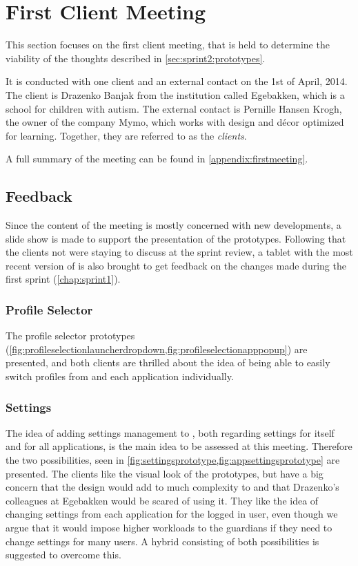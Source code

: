 \section{First Client Meeting}\label{sec:sprint2:firstmeeting}
This section focuses on the first client meeting, that is held to determine the viability of the thoughts described in \cref{sec:sprint2:prototypes}.

It is conducted with one client and an external contact on the 1st of April, 2014.
The client is Drazenko Banjak from the institution called Egebakken, which is a school for children with autism.
The external contact is Pernille Hansen Krogh, the owner of the company Mymo, which works with design and décor optimized for learning.
Together, they are referred to as the \textit{clients}.

A full summary of the meeting can be found in \cref{appendix:firstmeeting}.

\subsection{Feedback}\label{sec:firstmeeting:feedback}
Since the content of the meeting is mostly concerned with new developments, a slide show is made to support the presentation of the prototypes.
Following that the clients not were staying to discuss \giraf at the sprint review, a tablet with the most recent version of \launcher is also brought to get feedback on the changes made during the first sprint (\cref{chap:sprint1}).


\subsubsection{Profile Selector}
The profile selector prototypes (\cref{fig:profileselectionlauncherdropdown,fig:profileselectionapppopup}) are presented, and both clients are thrilled about the idea of being able to easily switch profiles from \launcher and each \giraf application individually.

\subsubsection{Settings}
The idea of adding settings management to \launcher, both regarding settings for \launcher itself and for all \giraf applications, is the main idea to be assessed at this meeting.
Therefore the two possibilities, seen in \cref{fig:settingsprototype,fig:appsettingsprototype} are presented.
The clients like the visual look of the prototypes, but have a big concern that the design would add to much complexity to \launcher and that Drazenko's colleagues at Egebakken would be scared of using it.
They like the idea of changing settings from each application for the logged in user, even though we argue that it would impose higher workloads to the guardians if they need to change settings for many users.
A hybrid consisting of both possibilities is suggested to overcome this.

